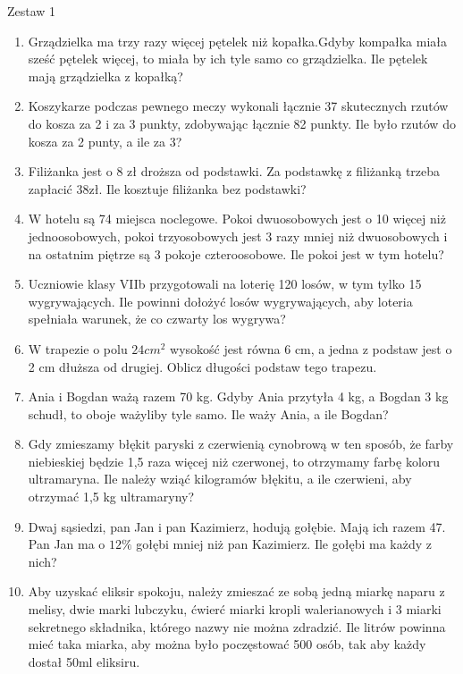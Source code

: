 \documentclass[12pt,a4paper]{article}
\begin{document}
	\LARGE \begin{center}
		Zestaw 1
	\end{center}
	\normalsize 
	\begin{enumerate}[1.]
		\item Grządzielka ma trzy razy więcej pętelek niż kopałka.Gdyby kompałka miała sześć pętelek więcej, to miała by ich tyle samo co grządzielka. Ile pętelek mają grządzielka z kopałką?
		\item Koszykarze podczas pewnego meczy wykonali łącznie 37 skutecznych rzutów do kosza za 2 i za 3 punkty, zdobywając łącznie 82 punkty. Ile było rzutów do kosza za 2 punty, a ile za 3?
		\item Filiżanka jest o 8 zł droższa od podstawki. Za podstawkę z filiżanką trzeba zapłacić 38zł. Ile kosztuje filiżanka bez podstawki?
		\item W hotelu są 74 miejsca noclegowe. Pokoi dwuosobowych jest o 10 więcej niż jednoosobowych, pokoi trzyosobowych jest 3 razy mniej niż dwuosobowych i na ostatnim piętrze są 3 pokoje czteroosobowe. Ile pokoi jest w tym hotelu?
		\item Uczniowie klasy VIIb przygotowali na loterię 120 losów, w tym tylko 15 wygrywających. Ile powinni dołożyć 
losów wygrywających, aby loteria spełniała warunek, że co czwarty los wygrywa?
		\item W trapezie o polu $24cm^2$ wysokość jest równa 6 cm, a jedna z podstaw jest o 2 cm dłuższa od drugiej. Oblicz długości podstaw tego trapezu.
		\item Ania i Bogdan ważą razem 70 kg. Gdyby Ania przytyła 4 kg, a Bogdan 3 kg schudł, to oboje ważyliby tyle samo. Ile waży Ania, a ile Bogdan?
		\item Gdy zmieszamy błękit paryski z czerwienią cynobrową w ten sposób, że farby niebieskiej będzie 1,5 raza 
więcej niż czerwonej, to otrzymamy farbę koloru ultramaryna. Ile należy wziąć kilogramów błękitu, a ile czerwieni, 
aby otrzymać 1,5 kg ultramaryny?
		\item Dwaj sąsiedzi, pan Jan i pan Kazimierz, hodują gołębie. Mają ich razem 47. Pan Jan ma o $12\%$ gołębi mniej 
niż pan Kazimierz. Ile gołębi ma każdy z nich?
		\item Aby uzyskać eliksir spokoju, należy zmieszać ze sobą jedną miarkę naparu z melisy, dwie marki lubczyku, 
ćwierć miarki kropli walerianowych i 3 miarki sekretnego składnika, którego nazwy nie można zdradzić. Ile litrów 
powinna mieć taka miarka, aby można było poczęstować 500 osób, tak aby każdy dostał 50ml eliksiru.
	\end{enumerate}
\end{document}

